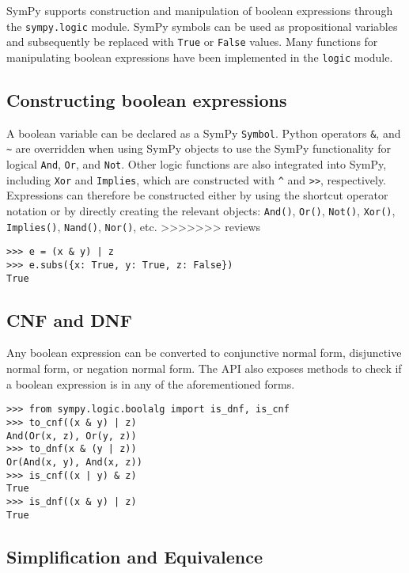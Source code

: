 
SymPy supports construction and manipulation of boolean expressions
through the \texttt{sympy.logic} module. SymPy symbols can be used as
propositional variables and subsequently be replaced with \texttt{True}
or \texttt{False} values. Many functions for manipulating boolean
expressions have been implemented in the \texttt{logic} module.

\subsection{Constructing boolean expressions}

A boolean variable can be declared as a SymPy \verb|Symbol|. Python operators
\texttt{\&}, \texttt{\textbar{}} and \texttt{\textasciitilde{}} are overridden
when using SymPy objects to use the SymPy functionality for logical
\texttt{And}, \texttt{Or}, and \texttt{Not}. Other logic functions are also
integrated into SymPy, including \texttt{Xor} and \texttt{Implies}, which are
constructed with \texttt{\^{}} and \texttt{\textgreater{}\textgreater{}},
respectively. Expressions can therefore be constructed either by using
the shortcut operator notation or by directly creating the relevant
objects: \verb|And()|,
\verb|Or()|, \verb|Not()|, \verb|Xor()|, \verb|Implies()|, \verb|Nand()|,
\verb|Nor()|, etc.
>>>>>>> reviews

\begin{verbatim}
>>> e = (x & y) | z
>>> e.subs({x: True, y: True, z: False})
True
\end{verbatim}

\subsection{CNF and DNF}

Any boolean expression can be converted to conjunctive normal form, disjunctive
normal form, or negation normal form. The API also exposes methods to check if
a boolean expression is in any of the aforementioned forms.

\begin{verbatim}
>>> from sympy.logic.boolalg import is_dnf, is_cnf
>>> to_cnf((x & y) | z)
And(Or(x, z), Or(y, z))
>>> to_dnf(x & (y | z))
Or(And(x, y), And(x, z))
>>> is_cnf((x | y) & z)
True
>>> is_dnf((x & y) | z)
True
\end{verbatim}

\subsection{Simplification and Equivalence}

